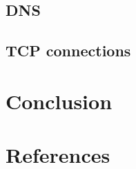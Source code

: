 \documentclass[compilation.tex]{subfiles}
\begin{document}

\subsection{DNS}
\label{exp:5}


\subsection{TCP connections}
\label{exp:6}

%

\section{Conclusion}
\label{sec:conclusion}

\section{References}
\label{sec:references}
\end{document}
